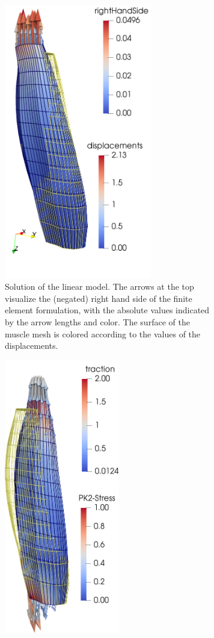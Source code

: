 \begin{figure}
  \centering%
  \hfill
  \begin{subfigure}[t]{0.4\textwidth}%
    \centering%
    \includegraphics[height=12cm]{images/results/basic/lin_nonlin_muscle_mechanics_b.png}%
    \caption{Solution of the linear model. The arrows at the top visualize the (negated) right hand side of the finite element formulation, with the absolute values indicated by the arrow lengths and color. The surface of the muscle mesh is colored according to the values of the displacements.}%
    \label{fig:lin_nonlin_muscle_mechanics_b}%
  \end{subfigure}\hfill
  \begin{subfigure}[t]{0.4\textwidth}%
    \centering%
    \includegraphics[height=12cm]{images/results/basic/lin_nonlin_muscle_mechanics_a.png}%

\end{subfigure}
\end{figure}

